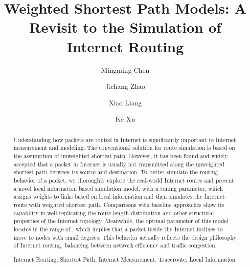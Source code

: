 \documentclass[a4paper]{llncs}
\newcommand{\keywords}[1]{\par\addvspace\baselineskip
\noindent\keywordname\enspace\ignorespaces#1}
\begin{document}
\mainmatter  
\title{Weighted Shortest Path Models: A Revisit to the Simulation of Internet Routing}


\author{Mingming Chen \and Jichang Zhao \and Xiao Liang \and Ke Xu}



\maketitle


\begin{abstract}
Understanding how packets are routed in Internet is significantly important to Internet measurement and modeling. The conventional solution for route simulation is based on the assumption of unweighted shortest path. However, it has been found and widely accepted that a packet in Internet is usually not transmitted along the unweighted shortest path between its source and destination. To better simulate the routing behavior of a packet, we thoroughly explore the real-world Internet routes and present a novel local information based simulation model, with a tuning parameter, which assigns weights to links based on local information and then simulates the Internet route with weighted shortest path. Comparisons with baseline approaches show its capability in well replicating the route length distribution and other structural properties of the Internet topology. Meanwhile, the optimal parameter of this model locates in the range of , which implies that a packet inside the Internet inclines to move to nodes with small degrees. This behavior actually reflects the design philosophy of Internet routing, balancing between network efficiency and traffic congestion.

\keywords{Internet Routing, Shortest Path, Internet Measurement, Traceroute, Local Information}
\end{abstract}
\end{document}
